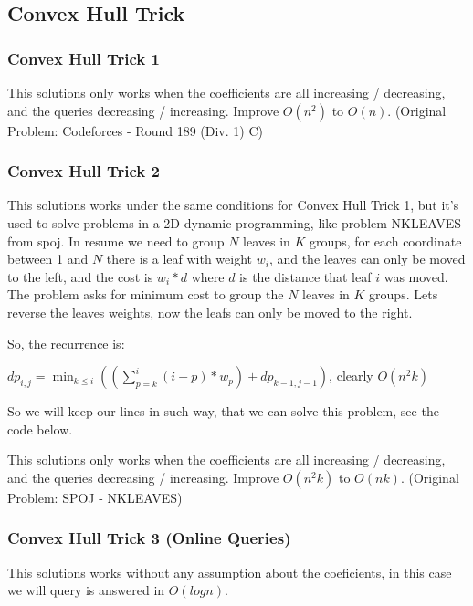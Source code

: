     \subsection{Convex Hull Trick}
        \subsubsection{Convex Hull Trick 1}
        This solutions only works when the coefficients are all increasing / decreasing, and the queries decreasing / increasing. Improve $O(n^2)$ to $O(n)$. (Original Problem: Codeforces - Round 189 (Div. 1) C)
        
        
        \subsubsection{Convex Hull Trick 2}
        This solutions works under the same conditions for Convex Hull Trick 1, but it's used to solve problems in a 2D dynamic programming, like problem NKLEAVES from spoj. In resume we need to group $N$ leaves in $K$ groups, for each coordinate between 1 and $N$ there is a leaf with weight $w_i$, and the leaves can only be moved to the left, and the cost is $w_i * d$ where $d$ is the distance that leaf $i$ was moved. The problem asks for minimum cost to group the $N$ leaves in $K$ groups. Lets reverse the leaves weights, now the leafs can only be moved to the right.
        
        So, the recurrence is:
        
        \bigskip
        
        $dp_{i, j} = \min_{k \leq i} ( (\sum_{p=k}^{i} (i - p) * w_p) + dp_{k - 1, j - 1})$, clearly $O(n^2k)$
        
        \bigskip
        
        So we will keep our lines in such way, that we can solve this problem, see the code below. 
        
        This solutions only works when the coefficients are all increasing / decreasing, and the queries decreasing / increasing. Improve $O(n^2k)$ to $O(nk)$. (Original Problem: SPOJ - NKLEAVES)
        
        
        
        \subsubsection{Convex Hull Trick 3 (Online Queries)}
        This solutions works without any assumption about the coeficients, in this case we will query is answered in $O(logn)$.
        

